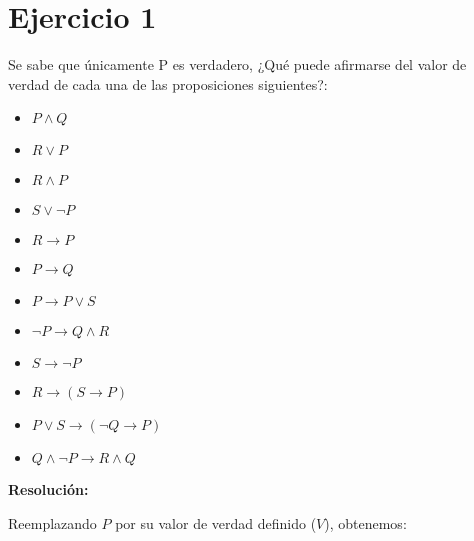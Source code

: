\documentclass{article}
\title{
    \author{Rodrigo José Alva Sáenz}
    \date{\small \today}
}
\begin{document}
\maketitle %

\newcommand{\Ejercicio}[2]{
    \section*{Ejercicio #1}

    {#2}

    \bigskip
    \textbf{Resolución:}
    \bigskip
}

\newcommand{\limplies}{\rightarrow}

\newpage

\Ejercicio{1}{
    Se sabe que únicamente P es verdadero, ¿Qué puede afirmarse del valor de verdad de cada una de las proposiciones siguientes?:
    \begin{multicols}{3}
        \begin{itemize}
            \item $P \land Q$
            \item $R \lor P$
            \item $R \land P$
            \item $S \lor \lnot P$
            \item $R \limplies P$
            \item $P \limplies Q$
            \item $P \limplies P \lor S$
            \item $\lnot P \limplies Q \land R$
            \item $S \limplies \lnot P$
            \item $R \limplies (S \limplies P)$
            \item $P \lor S \limplies (\lnot Q \limplies P)$
            \item $Q \land \lnot P \limplies R \land Q$
        \end{itemize}
    \end{multicols}
}

Reemplazando $P$ por su valor de verdad definido ($V$), obtenemos:
\end{document}
